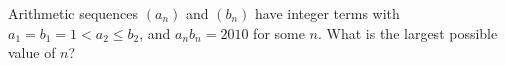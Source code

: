 Arithmetic sequences $(a_n)$ and $(b_n)$ have integer terms with $a_1=b_1=1<a_2\le b_2$, and $a_nb_n=2010$ for some $n$. What is the largest possible value of $n$?
